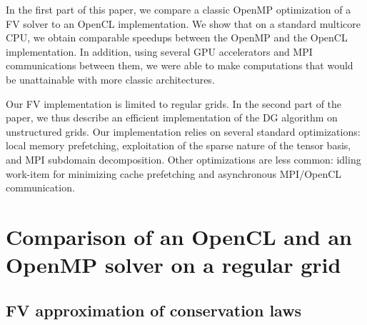 \documentclass[preprint]{sig-alternate}
\begin{document}
In the first part of this paper, we compare a classic OpenMP optimization of a FV solver to an OpenCL implementation. We show that on a standard multicore CPU, we obtain comparable speedups between the OpenMP and the OpenCL implementation. In addition, using several GPU accelerators and MPI communications between them, we were able to make computations that would be unattainable with more classic architectures.

Our FV implementation is limited to regular grids. In the second part of the paper, we thus describe an efficient implementation of the DG algorithm on unstructured grids.  Our implementation relies on several standard optimizations: local memory prefetching, exploitation of the sparse nature of the tensor basis, and MPI subdomain decomposition. Other optimizations are less common: idling work-item for minimizing cache prefetching and asynchronous MPI/OpenCL communication.

\section{\label{fv}Comparison of an OpenCL and an OpenMP solver on a regular grid}

\subsection{FV approximation of conservation laws}
\end{document}
